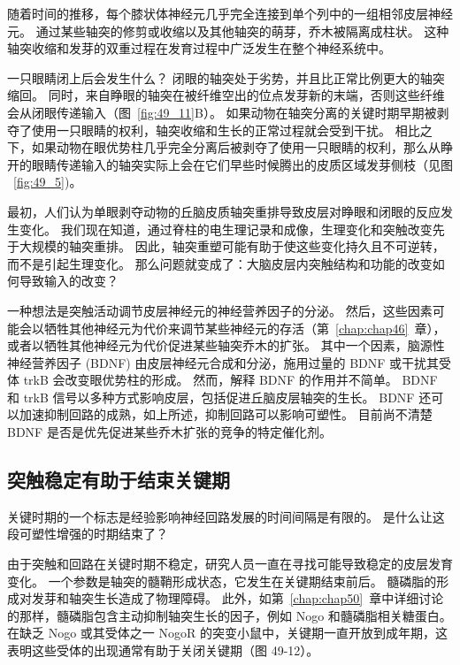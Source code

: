 随着时间的推移，每个膝状体神经元几乎完全连接到单个列中的一组相邻皮层神经元。
通过某些轴突的修剪或收缩以及其他轴突的萌芽，乔木被隔离成柱状。
这种轴突收缩和发芽的双重过程在发育过程中广泛发生在整个神经系统中。


一只眼睛闭上后会发生什么？
闭眼的轴突处于劣势，并且比正常比例更大的轴突缩回。
同时，来自睁眼的轴突在被纤维空出的位点发芽新的末端，否则这些纤维会从闭眼传递输入（图~\ref{fig:49_11}B）。
如果动物在轴突分离的关键时期早期被剥夺了使用一只眼睛的权利，轴突收缩和生长的正常过程就会受到干扰。
相比之下，如果动物在眼优势柱几乎完全分离后被剥夺了使用一只眼睛的权利，那么从睁开的眼睛传递输入的轴突实际上会在它们早些时候腾出的皮质区域发芽侧枝（见图 ~\ref{fig:49_5})。


最初，人们认为单眼剥夺动物的丘脑皮质轴突重排导致皮层对睁眼和闭眼的反应发生变化。
我们现在知道，通过脊柱的电生理记录和成像，生理变化和突触改变先于大规模的轴突重排。
因此，轴突重塑可能有助于使这些变化持久且不可逆转，而不是引起生理变化。
那么问题就变成了：大脑皮层内突触结构和功能的改变如何导致输入的改变？


一种想法是突触活动调节皮层神经元的神经营养因子的分泌。
然后，这些因素可能会以牺牲其他神经元为代价来调节某些神经元的存活（第~\ref{chap:chap46}~章），或者以牺牲其他神经元为代价促进某些轴突乔木的扩张。
其中一个因素，脑源性神经营养因子 (BDNF) 由皮层神经元合成和分泌，施用过量的 BDNF 或干扰其受体 trkB 会改变眼优势柱的形成。
然而，解释 BDNF 的作用并不简单。
BDNF 和 trkB 信号以多种方式影响皮层，包括促进丘脑皮层轴突的生长。
BDNF 还可以加速抑制回路的成熟，如上所述，抑制回路可以影响可塑性。
目前尚不清楚 BDNF 是否是优先促进某些乔木扩张的竞争的特定催化剂。



\subsection{突触稳定有助于结束关键期}

关键时期的一个标志是经验影响神经回路发展的时间间隔是有限的。 是什么让这段可塑性增强的时期结束了？


由于突触和回路在关键时期不稳定，研究人员一直在寻找可能导致稳定的皮层发育变化。
一个参数是轴突的髓鞘形成状态，它发生在关键期结束前后。
髓磷脂的形成对发芽和轴突生长造成了物理障碍。
此外，如第~\ref{chap:chap50}~章中详细讨论的那样，髓磷脂包含主动抑制轴突生长的因子，例如 Nogo 和髓磷脂相关糖蛋白。 
在缺乏 Nogo 或其受体之一 NogoR 的突变小鼠中，关键期一直开放到成年期，这表明这些受体的出现通常有助于关闭关键期（图 49-12）。


